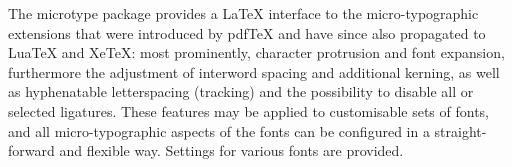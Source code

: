\documentclass[12pt]{article}
\begin{document}
\hsize=8cm
The microtype package provides a LaTeX interface to the micro-typographic extensions that were introduced by pdfTeX and have since also propagated to LuaTeX and XeTeX: most prominently, character protrusion and font expansion, furthermore the adjustment of interword spacing and additional kerning, as well as hyphenatable letterspacing (tracking) and the possibility to disable all or selected ligatures. These features may be applied to customisable sets of fonts, and all micro-typographic aspects of the fonts can be configured in a straight-forward and flexible way. Settings for various fonts are provided.
\end{document}
